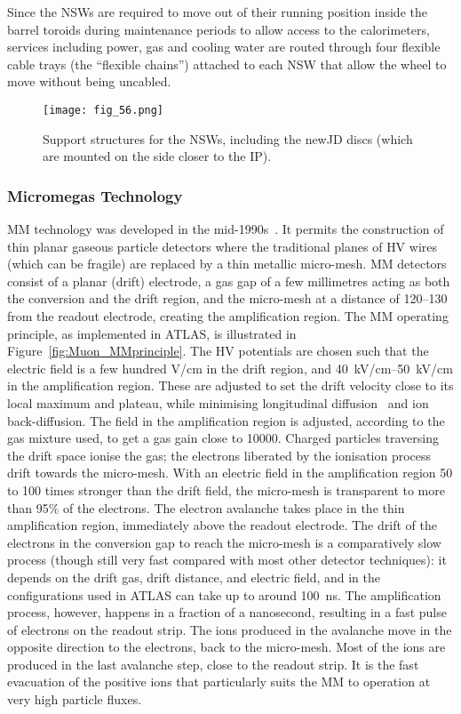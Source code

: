\documentclass[cernpreprint, atlasdraft=false, UKenglish,british,orcidlogo, texmf, orcidlogo]{atlasdoc}
\begin{document}
Since the \glspl{NSW} are required to move out of their running position inside the barrel toroids during maintenance periods to allow access to the calorimeters, services including power, gas and cooling water are routed through four flexible cable trays (the ``flexible chains'') attached to each \gls{NSW} that allow the wheel to move without being uncabled.
 
\begin{figure}[!h]
\centerline{\texttt{[image: fig\_56.png]}}
\caption{Support structures for the \glspl{NSW}, including the \gls{newJD} discs (which are mounted on the side closer to the \gls{IP}).}
\label{fig:Muon_NSWPassive}
\end{figure}
 
\subsubsection{Micromegas Technology \label{muonSS:MM}} 
\gls{MM} technology was developed in the mid-1990s~\cite{ref21TDR}. It permits the construction of thin planar
gaseous particle detectors where the traditional planes of \gls{HV} wires (which can be fragile) are replaced by a thin metallic micro-mesh.
\gls{MM} detectors consist of a planar (drift) electrode, a gas gap of a few millimetres acting as both the conversion and the drift region, and the micro-mesh at a distance of \SIrange{120}{130}{\micron} from the readout electrode, creating the amplification region. The \gls{MM} operating principle, as implemented in ATLAS, is illustrated in Figure~\ref{fig:Muon_MMprinciple}.
The \gls{HV} potentials are chosen such that the electric field is a few hundred \si{\volt/\cm} in the drift region, and \SIrange{40}{50}{\kilo\volt/\cm} in the amplification region.
These are adjusted to set the drift velocity close to its local maximum and plateau, while minimising longitudinal diffusion~\cite{ALEXOPOULOS2019125} and ion back-diffusion.
The field in the amplification region is adjusted, according to the gas mixture used, to get a gas gain close to \num{10000}.
Charged particles traversing the drift space ionise the gas; the electrons liberated by the ionisation process drift towards the micro-mesh. With an electric field in the amplification region 50 to 100 times stronger than the drift field, the micro-mesh is transparent to more than 95\% of the electrons. The electron avalanche takes place in the thin amplification region, immediately above the readout electrode. The drift of the electrons in the conversion gap to reach the micro-mesh is a comparatively slow process (though still very fast compared with most other detector techniques): it depends on the drift gas, drift distance, and electric field, and in the configurations used in ATLAS can take up to around \SI{100}{\ns}.
The amplification process, however, happens in a fraction of a nanosecond, resulting in a fast pulse of electrons on the readout strip. The ions produced in the avalanche move in the opposite direction to the electrons, back to the micro-mesh. Most of the ions are produced in the last avalanche step, close to the readout strip. It is the fast evacuation of the positive ions that particularly suits the \gls{MM} to operation at very high particle fluxes.
 
\end{document}
